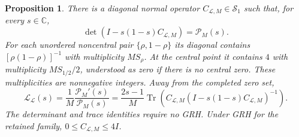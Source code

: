 \documentclass[11pt,a4paper]{article}
\newcommand{\Tr}{\operatorname{Tr}}
\newcommand{\C}{\mathbb C}
\newtheorem*{proposition}{Proposition}
\begin{document}
\begin{proposition}
There is a diagonal normal operator $C_{\mathcal L,M}\in\mathcal S_1$
such that, for every $s\in\C$,
\begin{equation}\label{eq:DET18det}
 \det(I-s(1-s)C_{\mathcal L,M})=\mathscr P_M(s).
\end{equation}
For each unordered noncentral pair $\{\rho,1-\rho\}$ its diagonal
contains
$[\rho(1-\rho)]^{-1}$ with multiplicity $MS_\rho$.
At the central point it contains $4$ with multiplicity $MS_{1/2}/2$,
understood as zero if there is no central zero.
These multiplicities are nonnegative integers.
Away from the completed zero set,
\begin{equation}\label{eq:DET18resolvent}
 \mathscr L_{\mathcal L}(s)
 =\frac1M\frac{\mathscr P_M'(s)}{\mathscr P_M(s)}
 =\frac{2s-1}{M}
 \Tr\!\left(C_{\mathcal L,M}
 (I-s(1-s)C_{\mathcal L,M})^{-1}\right).
\end{equation}
The determinant and trace identities require no GRH. Under GRH for the
retained family, $0\le C_{\mathcal L,M}\le4I$.
\end{proposition}
\end{document}
